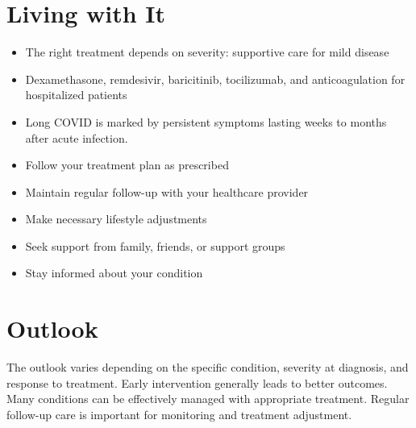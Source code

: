 \section{Living with It}
\begin{itemize}[noitemsep]
  \item The right treatment depends on severity: supportive care for mild disease
  \item Dexamethasone, remdesivir, baricitinib, tocilizumab, and anticoagulation for hospitalized patients
  \item Long COVID is marked by persistent symptoms lasting weeks to months after acute infection.
  \item Follow your treatment plan as prescribed
  \item Maintain regular follow-up with your healthcare provider
  \item Make necessary lifestyle adjustments
  \item Seek support from family, friends, or support groups
  \item Stay informed about your condition
\end{itemize}
\section{Outlook}
The outlook varies depending on the specific condition, severity at diagnosis, and response to treatment. Early intervention generally leads to better outcomes. Many conditions can be effectively managed with appropriate treatment. Regular follow-up care is important for monitoring and treatment adjustment.
